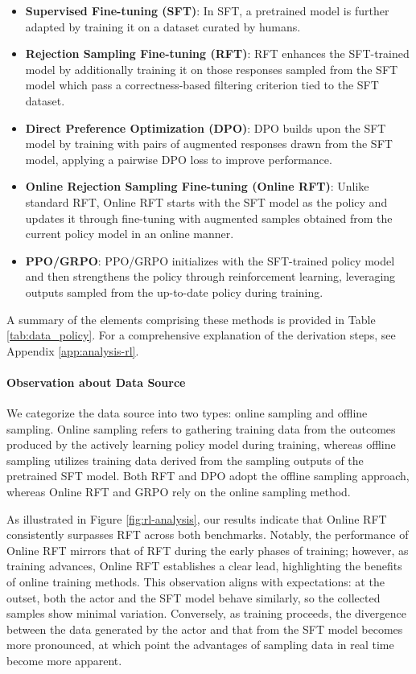 \begin{itemize}[topsep=0pt]
\begin{itemize}[topsep=0pt]
\begin{itemize}
    \item  \textbf{Supervised Fine-tuning (SFT)}: In SFT, a pretrained model is further adapted by training it on a dataset curated by humans.
    \item \textbf{Rejection Sampling Fine-tuning (RFT)}: RFT enhances the SFT-trained model by additionally training it on those responses sampled from the SFT model which pass a correctness-based filtering criterion tied to the SFT dataset.
    \item \textbf{Direct Preference Optimization (DPO)}: DPO builds upon the SFT model by training with pairs of augmented responses drawn from the SFT model, applying a pairwise DPO loss to improve performance.
    \item \textbf{Online Rejection Sampling Fine-tuning (Online RFT)}: Unlike standard RFT, Online RFT starts with the SFT model as the policy and updates it through fine-tuning with augmented samples obtained from the current policy model in an online manner.
    \item \textbf{PPO/GRPO}: PPO/GRPO initializes with the SFT-trained policy model and then strengthens the policy through reinforcement learning, leveraging outputs sampled from the up-to-date policy during training.
\end{itemize}

A summary of the elements comprising these methods is provided in Table \ref{tab:data_policy}. For a comprehensive explanation of the derivation steps, see Appendix \ref{app:analysis-rl}.

\paragraph{Observation about Data Source} We categorize the data source into two types: online sampling and offline sampling. Online sampling refers to gathering training data from the outcomes produced by the actively learning policy model during training, whereas offline sampling utilizes training data derived from the sampling outputs of the pretrained SFT model. Both RFT and DPO adopt the offline sampling approach, whereas Online RFT and GRPO rely on the online sampling method.

As illustrated in Figure \ref{fig:rl-analysis}, our results indicate that Online RFT consistently surpasses RFT across both benchmarks. Notably, the performance of Online RFT mirrors that of RFT during the early phases of training; however, as training advances, Online RFT establishes a clear lead, highlighting the benefits of online training methods. This observation aligns with expectations: at the outset, both the actor and the SFT model behave similarly, so the collected samples show minimal variation. Conversely, as training proceeds, the divergence between the data generated by the actor and that from the SFT model becomes more pronounced, at which point the advantages of sampling data in real time become more apparent.


\end{itemize}
\end{itemize}
